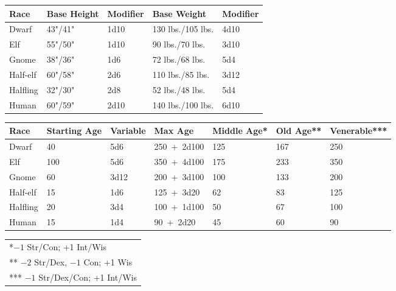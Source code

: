 \noindent
\begin{minipage}{\columnwidth}

\label{heightweight}
\noindent
\begin{tabular}{|m{}|m{}|m{}|m{}|m{}|}
\hline
Race		& Base Height		& Modifier	& Base Weight	& Modifier \\
\hline\hline
\rowcolor[gray]{.9}Dwarf		& 43"/41"			& 1d10		& 130 lbs./105 lbs.		& 4d10 \\
Elf			& 55"/50"			& 1d10		& 90 lbs./70 lbs.		& 3d10 \\
\rowcolor[gray]{.9}Gnome		& 38"/36"			& 1d6		& 72 lbs./68 lbs.		& 5d4 \\
Half-elf	& 60"/58"			& 2d6		& 110 lbs./85 lbs.		& 3d12 \\
\rowcolor[gray]{.9}Halfling	& 32"/30"			& 2d8		& 52 lbs./48 lbs.		& 5d4 \\
Human		& 60"/59"			& 2d10		& 140 lbs./100 lbs.		& 6d10 \\
\hline
\end{tabular}

\end{minipage}

\noindent
\begin{minipage}{\columnwidth}

\label{age}
\noindent
\begin{tabular}{|m{}|m{}|m{}|m{}|m{}|m{}|m{}|}
\hline
Race	& Starting Age	& Variable	& Max Age	& Middle Age*	& Old Age** & Venerable*** \\
\hline\hline
\rowcolor[gray]{.9}Dwarf		& 40	& 5d6	& 250~+~2d100	& 125	& 167	& 250 \\
Elf			& 100	& 5d6	& 350~+~4d100	& 175	& 233	& 350 \\
\rowcolor[gray]{.9}Gnome		& 60	& 3d12	& 200~+~3d100	& 100	& 133	& 200 \\
Half-elf	& 15	& 1d6	& 125~+~3d20	& 62	& 83	& 125 \\
\rowcolor[gray]{.9}Halfling	& 20	& 3d4	& 100~+~1d100	& 50	& 67	& 100 \\
Human		& 15		& 1d4	& 90~+~2d20	& 45	& 60	& 90 \\
\hline
\end{tabular}
\noindent
\begin{tabular}{p{\textwidth}}
*$-1$ Str/Con; +1 Int/Wis \\
** $-2$ Str/Dex, $-1$ Con; +1 Wis \\
*** $-1$ Str/Dex/Con; +1 Int/Wis \\
\end{tabular}\vspace{.5em}

\end{minipage}

